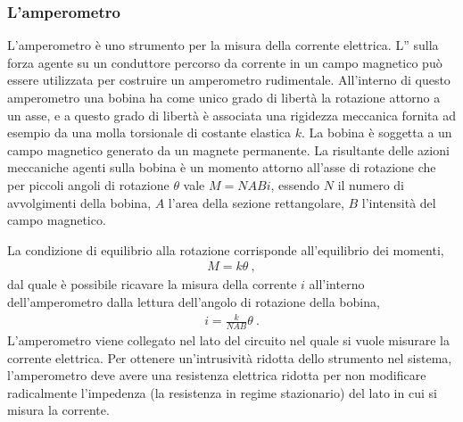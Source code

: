 \documentclass[letterpaper,10pt,italian]{jupyterBook}
\begin{document}
\subsubsection{L’amperometro}
\label{\detokenize{ch/electromagnetism/electromagnetism-steady:l-amperometro}}\label{\detokenize{ch/electromagnetism/electromagnetism-steady:physics-hs-electromagnetism-electromagnetism-steady-experience-faraday-amperometer}}
\sphinxAtStartPar
L’amperometro è uno strumento per la misura della corrente elettrica. L”{\hyperref[\detokenize{ch/electromagnetism/electromagnetism-steady:physics-hs-electromagnetism-electromagnetism-steady-experience-faraday}]{}} sulla forza agente su un conduttore percorso da corrente in un campo magnetico può essere utilizzata per costruire un amperometro rudimentale. All’interno di questo amperometro una bobina ha come unico grado di libertà la rotazione attorno a un asse, e a questo grado di libertà è associata una rigidezza meccanica fornita ad esempio da una molla torsionale di costante elastica \(k\). La bobina è soggetta a un campo magnetico generato da un magnete permanente. La risultante delle azioni meccaniche agenti sulla bobina è un momento attorno all’asse di rotazione che per piccoli angoli di rotazione \(\theta\) vale \(M = N A B i\), essendo \(N\) il numero di avvolgimenti della bobina, \(A\) l’area della sezione rettangolare, \(B\) l’intensità del campo magnetico.

\sphinxAtStartPar
La condizione di equilibrio alla rotazione corrisponde all’equilibrio dei momenti,
\begin{equation*}
\begin{split}M = k \theta \ ,\end{split}
\end{equation*}
\sphinxAtStartPar
dal quale è possibile ricavare la misura della corrente \(i\) all’interno dell’amperometro dalla lettura dell’angolo di rotazione della bobina,
\begin{equation*}
\begin{split}i = \frac{k}{N A B} \theta \ .\end{split}
\end{equation*}
\sphinxAtStartPar
L’amperometro viene collegato  nel lato del circuito nel quale si vuole misurare la corrente elettrica. Per ottenere un’intrusività ridotta dello strumento nel sistema, l’amperometro deve avere una resistenza elettrica ridotta per non modificare radicalmente l’impedenza (la resistenza in regime stazionario) del lato in cui si misura la corrente.
\end{document}

